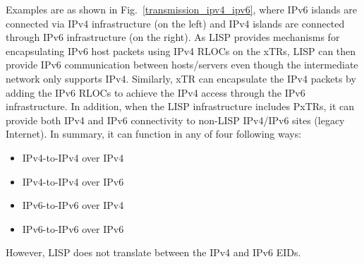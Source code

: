 Examples are as shown in Fig.~\ref{transmission_ipv4_ipv6}, where IPv6 islands are connected via IPv4 infrastructure (on the left) and IPv4 islands are connected through IPv6 infrastructure (on the right). As LISP provides mechanisms for encapsulating IPv6 host packets using IPv4 RLOCs on the xTRs, LISP can then provide IPv6 communication between hosts/servers even though the intermediate network only supports IPv4. Similarly, xTR can encapsulate the IPv4 packets by adding the IPv6 RLOCs to achieve the IPv4 access through the IPv6 infrastructure. In addition, when the LISP infrastructure includes PxTRs, it can provide both IPv4 and IPv6 connectivity to non-LISP IPv4/IPv6 sites (legacy Internet). In summary, it can function in any of four following ways:
\begin{itemize}[noitemsep,topsep=0pt]
	\item IPv4-to-IPv4 over IPv4
	\item IPv4-to-IPv4 over IPv6
	\item IPv6-to-IPv6 over IPv4
	\item IPv6-to-IPv6 over IPv6
\end{itemize}
However, LISP does not translate between the IPv4 and IPv6 EIDs.



